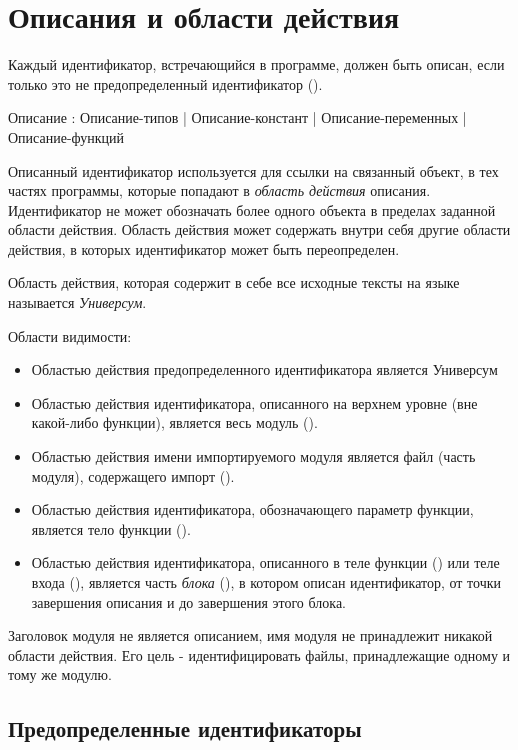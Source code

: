\hypertarget{decls}{%
\section{Описания и области действия}\label{decls:chapter}}

Каждый идентификатор, встречающийся в программе, должен быть описан, если только это
не предопределенный идентификатор ().

\begin{Grammar}
Описание
	: Описание-типов
	| Описание-констант
	| Описание-переменных
	| Описание-функций
\end{Grammar} 

Описанный идентификатор используется для ссылки на связанный объект, в тех частях программы, которые попадают в \emph{область действия} описания. 
Идентификатор не может обозначать более одного объекта в пределах заданной области действия. 
Область действия может содержать внутри себя другие области действия, в которых идентификатор может быть переопределен.

Область действия, которая содержит в себе все исходные тексты на языке \thelang{} называется \emph{Универсум}.

Области видимости:
\begin{itemize}
\item
Областью действия предопределенного идентификатора является Универсум
\item
Областью действия идентификатора, описанного на верхнем уровне (вне какой-либо функции), является весь модуль ().
\item
Областью действия имени импортируемого модуля является файл (часть модуля), содержащего импорт ().
\item
Областью действия идентификатора, обозначающего параметр функции, является тело функции ().
\item
Областью действия идентификатора, описанного в теле функции () или теле входа (), является часть \emph{блока} (), в котором описан идентификатор, от точки завершения описания и до завершения этого блока. 
\end{itemize}

Заголовок модуля не является описанием, имя модуля не принадлежит никакой области действия. Его цель - идентифицировать файлы, принадлежащие одному и тому же модулю.

\hypertarget{predefined-idents}{%
\subsection{Предопределенные идентификаторы}\label{decls:predefined-idents}}

